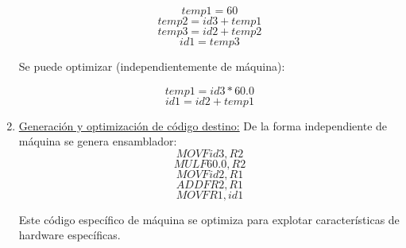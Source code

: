 \documentclass[10pt,a4paper]{report}
\begin{document}
\begin{enumerate}
                    \begin{equation}
                        temp1 = 60
                    \end{equation}
                    \begin{equation}
                        temp2 = id3 + temp1
                    \end{equation}
                    \begin{equation}
                        temp3 = id2 + temp2
                    \end{equation}
                    \begin{equation}
                        id1 = temp3 
                    \end{equation}

                    \par Se puede optimizar (independientemente de máquina):
                    
                    \begin{equation}
                        temp1 = id3 * 60.0
                    \end{equation}
                    \begin{equation}
                        id1 = id2 + temp1 
                    \end{equation}

                \item \underline{Generación y optimización de código destino:} De la forma independiente de máquina se 
                    genera ensamblador:
                    \begin{equation}
                     MOVF id3, R2
                     \end{equation}
                     \begin{equation}
                     MULF 60.0, R2
                     \end{equation}
                     \begin{equation}
                     MOVF id2, R1
                     \end{equation}
                     \begin{equation}
                     ADDF R2, R1
                     \end{equation}
                     \begin{equation}
                     MOVF R1, id1
                     \end{equation}
                     
                     \par Este código específico de máquina se optimiza para explotar características de hardware 
                        específicas.
            
            \end{enumerate}
\end{document}
